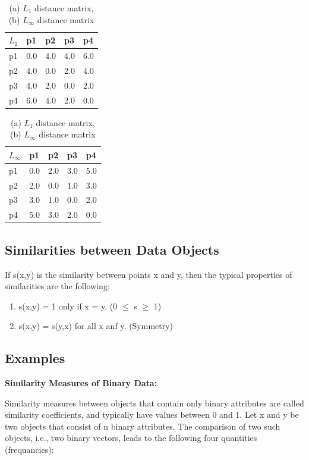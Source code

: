	\begin{table}[H]
		\centering
		\begin{tabular}{| l | l | l | l | l |}
			\hline
			$L_{1}$ & p1 & p2 & p3 & p4 \\ \hline
			p1 & 0.0 & 4.0 & 4.0 & 6.0 \\ \hline
			p2 & 4.0 & 0.0 & 2.0 & 4.0 \\ \hline
			p3 & 4.0 & 2.0 & 0.0 & 2.0 \\ \hline
			p4 & 6.0 & 4.0 & 2.0 & 0.0 \\ \hline
		\end{tabular}
		\begin{tabular}{| l | l | l | l | l |}
			\hline
			$L_\infty$ & p1 & p2 & p3 & p4 \\ \hline 
			p1 & 0.0 & 2.0 & 3.0 & 5.0 \\ \hline
			p2 & 2.0 & 0.0 & 1.0 & 3.0 \\ \hline
			p3 & 3.0 & 1.0 & 0.0 & 2.0 \\ \hline
			p4 & 5.0 & 3.0 & 2.0 & 0.0 \\ \hline
		\end{tabular}
		\caption{(a) $L_{1}$ distance matrix, (b) $L_{\infty}$ distance matrix}
	\end{table}

\subsection{Similarities between Data Objects}
	If s(x,y) is the similarity between points x and y, then the typical properties
	of similarities are the following:
		\begin{enumerate}
			\item s(x,y) = 1 only if x = y. (0 $\leq$ s $\geq$ 1)
			\item s(x,y) = s(y,x) for all x anf y. (Symmetry)
		\end{enumerate}

\clearpage
\subsection{Examples}

	{\bf Similarity Measures of Binary Data:}

	Similarity measures between objects that contain only binary attributes are called
	similarity coefficients, and typically have values between 0 and 1.
	Let x and y be two objects that consist of n binary attributes. The comparison 
	of two such objects, i.e., two binary vectors, leads to the following four quantities
	(frequancies):

